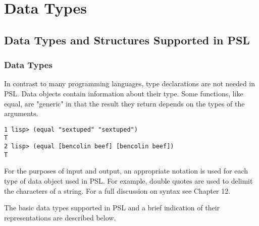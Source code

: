 \section{Data Types}

\subsection{Data Types and Structures Supported in PSL}

\subsubsection{Data Types}

In  contrast  to many programming languages, type declarations
are not needed in PSL.  Data objects contain  information  about
their  type.   Some functions, like equal, are "generic" in that
the result they return depends on the types of the arguments.

\begin{verbatim}
1 lisp> (equal "sextuped" "sextuped")
T
2 lisp> (equal [bencolin beef] [bencolin beef])
T
\end{verbatim}
For the purposes of input and output, an appropriate notation is
used for each type of data object used in  PSL.    For  example,
double  quotes  are  used to delimit the characters of a string.
For a full discussion on syntax see Chapter 12.

The basic data types supported in PSL and a  brief  indication
of their representations are described below.

